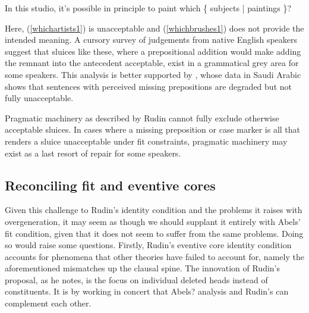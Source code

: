 \documentclass{turabian-researchpaper}
\begin{document}
\begin{exe}
\end{exe}

\begin{exe}
\ex\label{sproutingbad2}
\begin{xlist}
\ex \label{whichsubjects1} In this studio, it's possible in principle to paint which \{ subjects | paintings \}?
 \end{xlist}
 \end{exe}

Here, (\ref{whichartists1}) is unacceptable and (\ref{whichbrushes1}) does not provide the intended meaning. 
A cursory survey of judgements from native English speakers suggest that sluices like these, where a prepositional addition would make adding the remnant into the antecedent acceptable, exist in a grammatical grey area for some speakers. This analysis is better supported by \citet{klaustalksluicing}, whose data in Saudi Arabic shows that sentences with perceived missing prepositions are degraded but not fully unacceptable. 

Pragmatic machinery as described by Rudin cannot fully exclude otherwise acceptable sluices. In cases where a missing preposition or case marker is all that renders a sluice unacceptable under fit constraints, pragmatic machinery may exist as a last resort of repair for some speakers. 

\subsection{Reconciling fit and eventive cores }
Given this challenge to Rudin's identity condition and the problems it raises with overgeneration, it may seem as though we should supplant it entirely with Abels' fit condition, given that it does not seem to suffer from the same problems. Doing so would raise some questions. Firstly, Rudin's eventive core identity condition accounts for phenomena that other theories have failed to account for, namely the aforementioned mismatches up the clausal spine. The innovation of Rudin's proposal, as he notes, is the focus on individual deleted heads instead of constituents. It is by working in concert that Abels? analysis and Rudin's can complement each other. 
\end{document}
